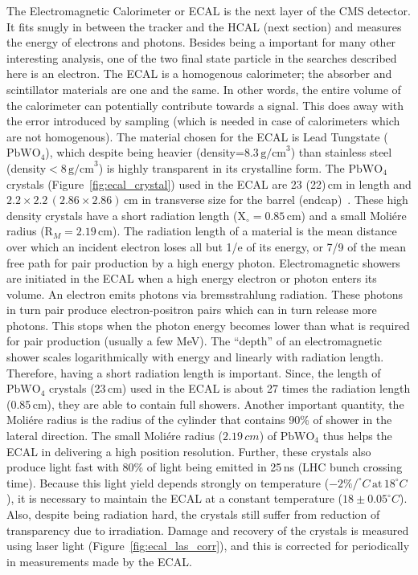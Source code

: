 The Electromagnetic Calorimeter or ECAL is the next layer of the CMS detector. It fits snugly in between the tracker and the HCAL (next section) and measures the energy of electrons and photons. Besides being a important for many other interesting analysis, one of the two final state particle in the searches described here is an electron. The ECAL is a homogenous calorimeter; the absorber and scintillator materials are one and the same. In other words, the entire volume of the calorimeter can potentially contribute towards a signal. This does away with the error introduced by sampling (which is needed in case of calorimeters which are not homogenous). The material chosen for the ECAL is Lead Tungstate ($\mathrm{PbWO}_4$), which despite being heavier (density=$8.3\,\mathrm{g/cm}^3$) than stainless steel (density$<8\,\mathrm{g/cm}^3$) is highly transparent in its crystalline form. The $\mathrm{PbWO}_4$ crystals (Figure~\ref{fig:ecal_crystal}) used in the ECAL are 23 (22)\,cm in length and $2.2\times2.2\,(2.86\times2.86)$\,cm in transverse size for the barrel (endcap)~\cite{ecal2}. These high density crystals have a short radiation length ($\mathrm{X}_{\circ}=0.85$\,cm) and a small Moli\'ere radius ($\mathrm{R}_{M}=2.19$\,cm). The radiation length of a material is the mean distance over which an incident electron loses all but 1/e of its energy, or 7/9 of the mean free path for pair production by a high energy photon. Electromagnetic showers are initiated in the ECAL when a high energy electron or photon enters its volume. An electron emits photons via bremsstrahlung radiation. These photons in turn pair produce electron-positron pairs which can in turn release more photons. This stops when the photon energy becomes lower than what is required for pair production (usually a few MeV). The ``depth'' of an electromagnetic shower scales logarithmically with energy and linearly with radiation length. Therefore, having a short radiation length is important. Since, the length of $\mathrm{PbWO}_4$ crystals (23\,cm) used in the ECAL is about 27 times the radiation length (0.85\,cm), they are able to contain full showers. Another important quantity, the Moli\'ere radius is the radius of the cylinder that contains 90\% of shower in the lateral direction. The small Moli\'ere radius ($2.19\,cm$) of $\mathrm{PbWO}_4$ thus helps the ECAL in delivering a high position resolution. Further, these crystals also produce light fast with 80\% of light being emitted in 25\,ns (LHC bunch crossing time). Because this light yield depends strongly on temperature ($-2\%/^{\circ}C\,\mathrm{at}\,18^{\circ}C$), it is necessary to maintain the ECAL at a constant temperature ($18\pm0.05^{\circ}C$). Also, despite being radiation hard, the crystals still suffer from reduction of transparency due to irradiation. Damage and recovery of the crystals is measured using laser light (Figure~\ref{fig:ecal_las_corr}), and this is corrected for periodically in measurements made by the ECAL.     
